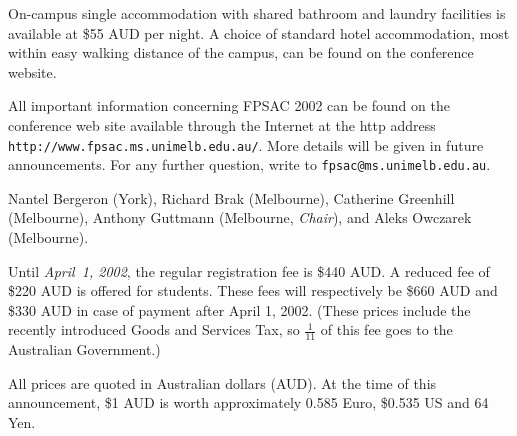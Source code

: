 
\noindent
On-campus single accommodation with shared bathroom and laundry
facilities is available at \$55 AUD per night.  A choice of
standard hotel accommodation, most within easy walking distance
of the campus, can be found on the conference website.


\noindent
All important information concerning FPSAC 2002 can be found on the
conference web site available through the Internet at the http address
{\verb!http://www.fpsac.ms.unimelb.edu.au/!}.
More details will be given in future announcements. For any further
question, write to {\tt fpsac@ms.unimelb.edu.au}.


\noindent
Nantel Bergeron (York),
Richard Brak (Melbourne), Catherine Greenhill (Melbourne), Anthony
Guttmann (Melbourne, {\it Chair}), and Aleks Owczarek (Melbourne).


\noindent
Until {\it April~1, 2002}, the regular registration fee is \$440 AUD.
A reduced fee of \$220 AUD is offered for students.
These fees will respectively be \$660 AUD and \$330 AUD
in case of payment after April 1, 2002. (These prices include the recently
introduced Goods and Services Tax, so $\frac{1}{11}$ of this fee goes
to the Australian Government.)


\noindent
All prices are quoted in Australian dollars (AUD).  At the time
of this announcement, \$1 AUD is worth approximately 0.585 Euro,
\$0.535 US and 64 Yen.
 






